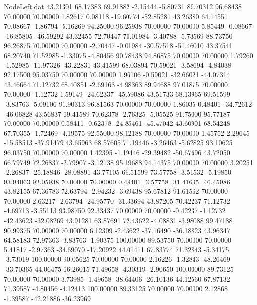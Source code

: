 \begin{filecontents}{NodeLeft.dat}
  43.21301   68.17383   69.91882    -2.15444   -5.80731   89.70312   96.68438   70.00000   70.00000    1.82617    0.08118  -19.60774  -52.85281
  43.26380   64.14551   70.08667    -1.86794   -5.16269   94.25000   96.25938   70.00000   70.00000    5.85449   -0.08667  -16.85805  -46.59292
  43.32455   72.70447   70.01984    -3.40788   -5.73569   88.73750   96.26875   70.00000   70.00000   -2.70447   -0.01984  -30.57518  -51.46010
  43.37541   68.20740   71.52985    -1.33075   -4.80456   90.78438   94.86875   70.00000   70.00000    1.79260   -1.52985  -11.97326  -43.22831
  43.41599   68.03894   70.59021    -3.58694   -4.84038   92.17500   95.03750   70.00000   70.00000    1.96106   -0.59021  -32.66021  -44.07314
  43.46664   71.12732   68.40851    -2.69163   -4.98363   89.94688   97.01875   70.00000   70.00000   -1.12732    1.59149  -24.62337  -45.59086
  43.51733   68.13965   69.51599    -3.83763   -5.09106   91.90313   96.81563   70.00000   70.00000    1.86035    0.48401  -34.72612  -46.06828
  43.56837   69.41589   70.62378    -2.76325   -5.05525   91.75000   95.77187   70.00000   70.00000    0.58411   -0.62378  -24.85461  -45.47042
  43.60901   68.54248   67.70355    -1.72469   -4.19575   92.55000   98.12188   70.00000   70.00000    1.45752    2.29645  -15.58513  -37.91479
  43.65963   68.57605   71.19446    -3.26463   -5.62825   93.10625   96.03750   70.00000   70.00000    1.42395   -1.19446  -29.39482  -50.67696
  43.72050   66.79749   72.26837    -2.79907   -3.12138   95.19688   94.14375   70.00000   70.00000    3.20251   -2.26837  -25.18846  -28.08891
  43.77105   69.51599   73.57758    -3.51532   -5.19850   93.94063   92.05938   70.00000   70.00000    0.48401   -3.57758  -31.41695  -46.45986
  43.82155   67.36783   72.63794    -2.94232   -3.69438   95.67812   91.61562   70.00000   70.00000    2.63217   -2.63794  -24.95770  -31.33694
  43.87205   70.42237   71.12732    -4.69713   -3.55113   93.98750   92.33437   70.00000   70.00000   -0.42237   -1.12732  -42.43623  -32.08269
  43.91281   63.87691   72.43622    -4.08831   -3.98088   99.47188   90.99375   70.00000   70.00000    6.12309   -2.43622  -37.16490  -36.18823
  43.96347   64.58183   72.97363    -3.83763   -1.90375  100.00000   89.53750   70.00000   70.00000    5.41817   -2.97363  -34.69070  -17.20922
  44.01411   67.83774   71.32843    -5.34175   -3.73019  100.00000   90.05625   70.00000   70.00000    2.16226   -1.32843  -48.26469  -33.70365
  44.06475   66.26015   71.49658    -4.30319   -2.90650  100.00000   89.73125   70.00000   70.00000    3.73985   -1.49658  -38.64406  -26.10136
  44.12560   67.87132   71.39587    -4.80456   -4.12413  100.00000   89.33125   70.00000   70.00000    2.12868   -1.39587  -42.21886  -36.23969

\end{filecontents}
